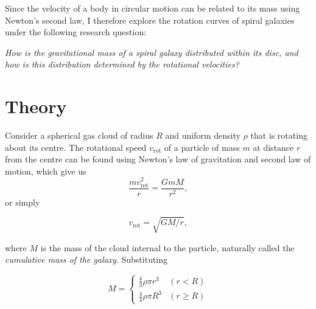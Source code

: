 \documentclass{article}
\begin{document}
Since the velocity of a body in circular motion can be related to its mass using Newton's second law, I therefore explore the rotation curves of spiral galaxies under the following research question:

\begin{center}
    \textit{How is the gravitational mass of a spiral galaxy distributed within its disc, and how is this distribution determined by the rotational velocities?}
\end{center}


\section{Theory}\label{sec:theory}

Consider a spherical gas cloud of radius \(R\) and uniform density \(\rho\) that is rotating about its centre.
The rotational speed \(v_{\text{rot}}\) of a particle of mass \(m\) at distance \(r\) from the centre can be found using Newton's law of gravitation and second law of motion, which give us
\[\frac{mv_{\text{rot}}^2}{r} = \frac{GmM}{r^2},\]
or simply

\begin{equation}
    v_{\text{rot}} = \sqrt{GM/r},
    \label{eq:vrotcummass}
\end{equation}

where \(M\) is the mass of the cloud internal to the particle, naturally called the \textit{cumulative mass of the galaxy}.
Substituting

\begin{equation}\label{eq:massdense}
    M =
    \begin{cases}
        \frac{4}{3}\rho\pi r^3 & (r < R) \\
        \frac{4}{4}\rho\pi R^3 & (r \ge R)
    \end{cases}
\end{equation}
\end{document}
